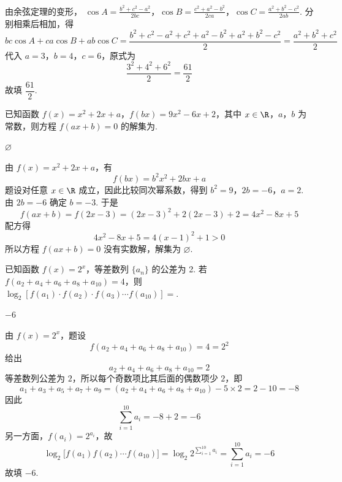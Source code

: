 \begin{solution}
由余弦定理的变形，
\(\cos A=\frac{b^2+c^2-a^2}{2bc}\)，\(\cos B=\frac{c^2+a^2-b^2}{2ca}\)，\(\cos C=\frac{a^2+b^2-c^2}{2ab}\).
分别相乘后相加，得
\[
bc\cos A+ca\cos B+ab\cos C
=\frac{b^2+c^2-a^2+c^2+a^2-b^2+a^2+b^2-c^2}{2}
=\frac{a^2+b^2+c^2}{2}
\]
代入 \(a=3\)，\(b=4\)，\(c=6\)，原式为
\[
\frac{3^2+4^2+6^2}{2}=\frac{61}{2}
\]
故填 \(\dfrac{61}{2}\).
\end{solution}

\begin{problem}
已知函数 \( f(x) = x^2 + 2x + a \)，\( f(bx) = 9x^2 - 6x + 2 \)，其中 \( x \in \R \)，\(a\)，\(b\) 为常数，则方程 \( f(ax + b) = 0 \) 的解集为\fillinblank{}.
\end{problem}

\begin{answer}
\(\varnothing\)
\end{answer}

\begin{solution}
由 \(f(x)=x^2+2x+a\)，有
\[
f(bx)=b^2x^2+2bx+a
\]
题设对任意 \(x\in\R\) 成立，因此比较同次幂系数，得到
\(b^2=9\)，\(2b=-6\)，\(a=2\).
由 \(2b=-6\) 确定 \(b=-3\). 于是
\[
f(ax+b)=f(2x-3)=(2x-3)^2+2(2x-3)+2=4x^2-8x+5
\]
配方得
\[
4x^2-8x+5=4(x-1)^2+1>0
\]
所以方程 \(f(ax+b)=0\) 没有实数解，解集为 \(\varnothing\).
\end{solution}

\begin{problem}
已知函数 \( f(x) = 2^x \)，等差数列 \( \{a_n\} \) 的公差为 2. 若 \( f(a_2 + a_4 + a_6 + a_8 + a_{10}) = 4 \)，则 \( \log_2[f(a_1) \cdot f(a_2) \cdot f(a_3) \cdots f(a_{10})] = \)\fillinblank{}.
\end{problem}

\begin{answer}
\(-6\)
\end{answer}

\begin{solution}
由 \(f(x)=2^x\)，题设
\[
f(a_2+a_4+a_6+a_8+a_{10})=4=2^2
\]
给出
\[
a_2+a_4+a_6+a_8+a_{10}=2
\]
等差数列公差为 \(2\)，所以每个奇数项比其后面的偶数项少 \(2\)，即
\[
a_1+a_3+a_5+a_7+a_9
=(a_2+a_4+a_6+a_8+a_{10})-5\times2
=2-10=-8
\]
因此
\[
\sum_{i=1}^{10}a_i=-8+2=-6
\]
另一方面，\(f(a_i)=2^{a_i}\)，故
\[
\log_2\bigl[f(a_1)f(a_2)\cdots f(a_{10})\bigr]
=\log_2 2^{\sum_{i=1}^{10}a_i}
=\sum_{i=1}^{10}a_i=-6
\]
故填 \(-6\).
\end{solution}


